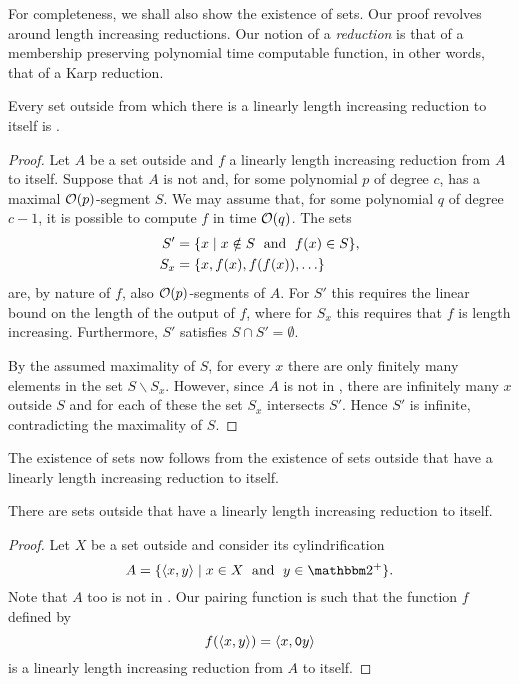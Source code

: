 For completeness, we shall also show the existence of  sets.
Our proof revolves around length increasing reductions.
Our notion of a \emph{reduction} is that of a membership preserving polynomial time computable function, in other words, that of a Karp reduction.
\begin{theorem}
  Every set outside  from which there is a linearly length increasing reduction to itself is .
\end{theorem}
\begin{proof}
  Let $A$ be a set outside  and $f$ a linearly length increasing reduction from $A$ to itself.
  Suppose that $A$ is not  and, for some polynomial $p$ of degree $c$, has a maximal $\operatorname{\mathcal{O}}(p)$-segment $S$.
  We may assume that, for some polynomial $q$ of degree $c - 1$, it is possible to compute $f$ in time $\operatorname{\mathcal{O}}(q)$.
  The sets
  \begin{align*}
    S' &= \{x \;{|}\; x \notin S \;\text{ and }\; f(x) \in S\}, \\
    S_x &= \{x, f(x), f(f(x)), \ldots\}
  \end{align*}
  are, by nature of $f$, also $\operatorname{\mathcal{O}}(p)$-segments of $A$.
  For $S'$ this requires the linear bound on the length of the output of $f$, where for $S_x$ this requires that $f$ is length increasing.
  Furthermore, $S'$ satisfies $S \cap S' = \emptyset$.

  By the assumed maximality of $S$, for every $x$ there are only finitely many elements in the set $S \backslash S_x$.
  However, since $A$ is not in , there are infinitely many $x$ outside $S$ and for each of these the set $S_x$ intersects $S'$.
  Hence $S'$ is infinite, contradicting the maximality of $S$.
\end{proof}

The existence of  sets now follows from the existence of sets outside  that have a linearly length increasing reduction to itself.
\begin{lemma}
  There are sets outside  that have a linearly length increasing reduction to itself.
\end{lemma}
\begin{proof}
  Let $X$ be a set outside  and consider its cylindrification \parencite{balcazar1990structural}
  \begin{equation*}
    A \deq \{\pair{x}{y} \st x \in X \reland y \in \binary^+\}.
  \end{equation*}
  Note that $A$ too is not in .
  Our pairing function is such that the function $f$ defined by
  \begin{equation*}
    f({\langle x, y\rangle}) = {\langle x, \textnormal{\texttt{0}}y\rangle}
  \end{equation*}
  is a linearly length increasing reduction from $A$ to itself.
\end{proof}

